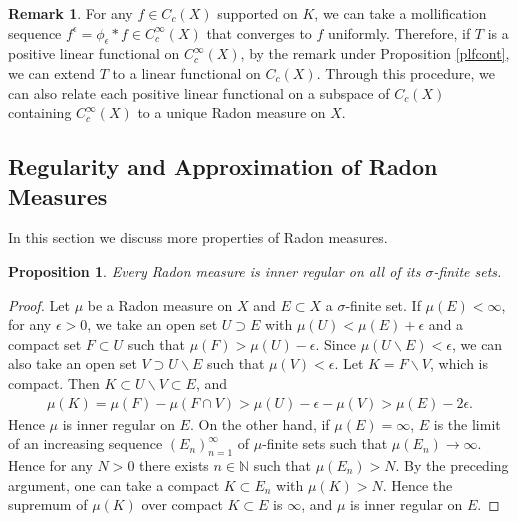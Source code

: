\documentclass{article}
\numberwithin{equation}{section}
\newcommand{\bbN}{\mathbb{N}}
\theoremstyle{plain}
\newtheorem{proposition}[theorem]{Proposition}
\theoremstyle{definition}
\newtheorem*{remark}{Remark}
\begin{document}
\begin{remark} 
For any $f\in C_c(X)$ supported on $K$, we can take a mollification sequence $f^\epsilon=\phi_\epsilon*f\in C_c^\infty(X)$ that converges to $f$ uniformly.
Therefore, if $T$ is a positive linear functional on $C_c^\infty(X)$, by the remark under Proposition \ref{plfcont}, we can extend $T$ to a linear functional on $C_c(X)$. Through this procedure, we can also relate each positive linear functional on a subspace of $C_c(X)$ containing $C_c^\infty(X)$ to a unique Radon measure on $X$.
\end{remark}

\newpage
\subsection{Regularity and Approximation of Radon Measures}
In this section we discuss more properties of Radon measures. 
\begin{proposition}\label{radonreg}
	Every Radon measure is inner regular on all of its $\sigma$-finite sets.
\end{proposition}
\begin{proof}
	Let $\mu$ be a Radon measure on $X$ and $E\subset X$ a $\sigma$-finite set. If $\mu(E)<\infty$, for any $\epsilon>0$, we take an open set $U\supset E$ with $\mu(U)<\mu(E)+\epsilon$ and a compact set $F\subset U$ such that $\mu(F)>\mu(U)-\epsilon$. Since $\mu(U\backslash E)<\epsilon$, we can also take an open set $V\supset U\backslash E$ such that $\mu(V)<\epsilon$. Let $K=F\backslash V$, which is compact. Then $K\subset U\backslash V\subset E$, and
	\begin{align*}
		\mu(K)=\mu(F)-\mu(F\cap V)>\mu(U)-\epsilon-\mu(V)>\mu(E)-2\epsilon.
	\end{align*}
	Hence $\mu$ is inner regular on $E$. On the other hand, if $\mu(E)=\infty$, $E$ is the limit of an increasing sequence $(E_n)_{n=1}^\infty$ of $\mu$-finite sets such that $\mu(E_n)\to\infty$. Hence for any $N>0$ there exists $n\in\bbN$ such that $\mu(E_n)>N$. By the preceding argument, one can take a compact $K\subset E_n$ with $\mu(K)>N$. Hence the supremum of $\mu(K)$ over compact $K\subset E$ is $\infty$, and $\mu$ is inner regular on $E$.
\end{proof}
\end{document}
